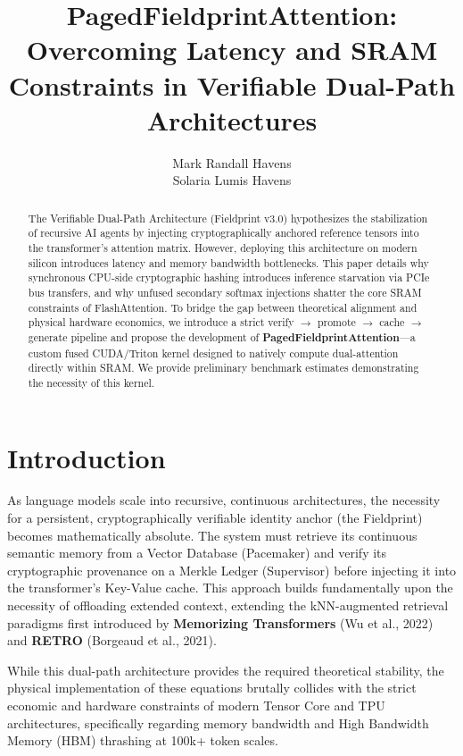 \documentclass{article}
\title{PagedFieldprintAttention: Overcoming Latency and SRAM Constraints in Verifiable Dual-Path Architectures}
\author{
 Mark Randall Havens \\
 \And
 Solaria Lumis Havens \\
}
\begin{document}
\maketitle

\begin{abstract}
The Verifiable Dual-Path Architecture (Fieldprint v3.0) hypothesizes the stabilization of recursive AI agents by injecting cryptographically anchored reference tensors into the transformer's attention matrix. However, deploying this architecture on modern silicon introduces latency and memory bandwidth bottlenecks. This paper details why synchronous CPU-side cryptographic hashing introduces inference starvation via PCIe bus transfers, and why unfused secondary softmax injections shatter the core SRAM constraints of FlashAttention. To bridge the gap between theoretical alignment and physical hardware economics, we introduce a strict verify $\rightarrow$ promote $\rightarrow$ cache $\rightarrow$ generate pipeline and propose the development of \textbf{PagedFieldprintAttention}---a custom fused CUDA/Triton kernel designed to natively compute dual-attention directly within SRAM. We provide preliminary benchmark estimates demonstrating the necessity of this kernel.
\end{abstract}

\section{Introduction}
As language models scale into recursive, continuous architectures, the necessity for a persistent, cryptographically verifiable identity anchor (the Fieldprint) becomes mathematically absolute. The system must retrieve its continuous semantic memory from a Vector Database (Pacemaker) and verify its cryptographic provenance on a Merkle Ledger (Supervisor) before injecting it into the transformer's Key-Value cache. This approach builds fundamentally upon the necessity of offloading extended context, extending the kNN-augmented retrieval paradigms first introduced by \textbf{Memorizing Transformers} (Wu et al., 2022) and \textbf{RETRO} (Borgeaud et al., 2021).

While this dual-path architecture provides the required theoretical stability, the physical implementation of these equations brutally collides with the strict economic and hardware constraints of modern Tensor Core and TPU architectures, specifically regarding memory bandwidth and High Bandwidth Memory (HBM) thrashing at 100k+ token scales.
\end{document}
